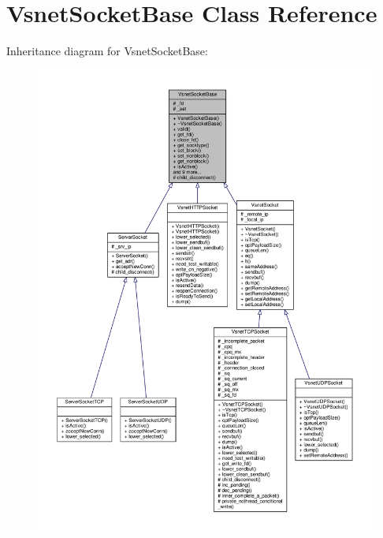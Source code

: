\hypertarget{classVsnetSocketBase}{}\section{Vsnet\+Socket\+Base Class Reference}
\label{classVsnetSocketBase}


Inheritance diagram for Vsnet\+Socket\+Base\+:
\nopagebreak
\begin{figure}[H]
\begin{center}
\leavevmode
\includegraphics[width=350pt]{dc/dee/classVsnetSocketBase__inherit__graph}
\end{center}
\end{figure}


